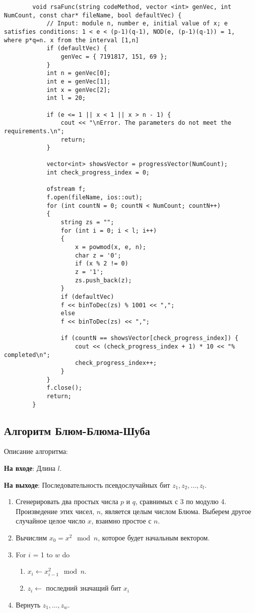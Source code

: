 \documentclass[bachelor, och, coursework]{shiza}
\begin{document}
	\begin{verbatim}
		void rsaFunc(string codeMethod, vector <int> genVec, int NumCount, const char* fileName, bool defaultVec) {
			// Input: module n, number e, initial value of x; e satisfies conditions: 1 < e < (p-1)(q-1), NOD(e, (p-1)(q-1)) = 1, where p*q=n. x from the interval [1,n]
			if (defaultVec) {
				genVec = { 7191817, 151, 69 };
			}
			int n = genVec[0];
			int e = genVec[1];
			int x = genVec[2];
			int l = 20;
			
			if (e <= 1 || x < 1 || x > n - 1) {
				cout << "\nError. The parameters do not meet the requirements.\n";
				return;
			}
			
			vector<int> showsVector = progressVector(NumCount);
			int check_progress_index = 0;
			
			ofstream f;
			f.open(fileName, ios::out);
			for (int countN = 0; countN < NumCount; countN++)
			{
				string zs = "";
				for (int i = 0; i < l; i++)
				{
					x = powmod(x, e, n);
					char z = '0';
					if (x % 2 != 0)
					z = '1';
					zs.push_back(z);
				}
				if (defaultVec)
				f << binToDec(zs) % 1001 << ",";
				else
				f << binToDec(zs) << ",";
				
				if (countN == showsVector[check_progress_index]) {
					cout << (check_progress_index + 1) * 10 << "% completed\n";
					check_progress_index++;
				}
			}
			f.close();
			return;
		}
	\end{verbatim}
	

	\subsection{Алгоритм Блюм-Блюма-Шуба}
	
	Описание алгоритма:
	
	\textbf{На входе}: Длина $l$.
	
	\textbf{На выходе}: Последовательность псевдослучайных бит $z_1, z_2, \dots, z_l$.

	\begin{enumerate}
		\item Сгенерировать два простых числа $p$ и $q$, сравнимых с 3 по модулю 4. Произведение этих чисел, $n$, является целым числом Блюма. Выберем другое случайное целое число $x$, взаимно простое с $n$.
		\item Вычислим $x_0 = x^2 \mod n$, которое будет начальным вектором.
		\item For $i$ = 1 to $w$ do
		\begin{enumerate}
			\item $x_i \leftarrow x_{i-1}^2 \mod n$.
			\item $z_i \leftarrow $ последний значащий бит $x_i$
		\end{enumerate}
		\item Вернуть $z_1, \dots, z_w$.
	\end{enumerate} \
	
\end{document}
